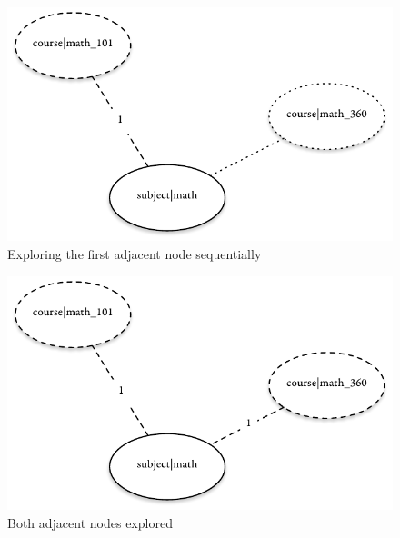 			\begin{figure}
				\centering
				\includegraphics[scale=0.9]{figures/graphs/concurrent/sequential}
				
				\caption{Exploring the first adjacent node sequentially}
				\label{fig:concurrent-sequential}
			\end{figure}
			
			\begin{figure}
				\centering
				\includegraphics[scale=0.9]{figures/graphs/concurrent/concurrent}
				
				\caption{Both adjacent nodes explored}
				\label{fig:concurrent-concurrent}
			\end{figure}
		
